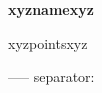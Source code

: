 \textbf{xyznamexyz}
\begin{itemize}[leftmargin=1.5em,itemsep=2pt,topsep=3pt]
xyzpointsxyz
\end{itemize}
-----
separator: \vspace{5pt}
